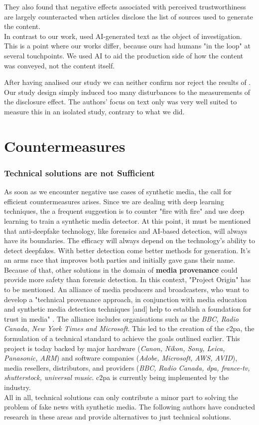 \documentclass[
  a4paper,  %
  twoside,  %
  bibliography=totoc,
  headsepline,
  cleardoublepage=empty,
  parskip=half,
  draft=false
]{scrbook}
\begin{document}
They also found that negative effects associated with perceived trustworthiness are largely counteracted when articles disclose the list of sources used to generate the content. \\
In contrast to our work, \citeauthor{toffTheyCouldJust2023} used AI-generated text as the object of investigation. This is a point where our works differ, because ours had humans "in the loop" at several touchpoints. We used AI to aid the production side of how the content was conveyed, not the content itself.

After having analised our study we can neither confirm nor reject the results of \citet{toffTheyCouldJust2023}. Our study design simply induced too many disturbances to the measurements of the disclosure effect. The authors' focus on text only was very well suited to measure this in an isolated study, contrary to what we did. 
\section{Countermeasures}
\label{sec:rel-work-counteringdf}
\subsubsection*{Technical solutions are not Sufficient}
As soon as we encounter negative use cases of synthetic media, the call for efficient countermeasures arises. Since we are dealing with deep learning techniques, the a frequent suggestion is to counter "fire with fire" and use deep learning to train a synthetic media detector. At this point, it must be mentioned that anti-deepfake technology, like forensics and AI-based detection, will always have its boundaries. The efficacy will always depend on the technology's ability to detect deepfakes. With better detection come better methods for generation. It's an arms race that improves both parties and initially gave \gls{gan}s their name. \\
Because of that, other solutions in the domain of \textbf{media provenance} could provide more safety than forensic detection. In this context, "Project Origin" has to be mentioned. An alliance of media producers and broadcasters, who want to develop a "technical provenance approach, in conjunction with media education and synthetic media detection techniques [and] help to establish a foundation for trust in media" \cite{ProjectOrigin}. The alliance includes organisations such as the \textit{BBC, Radio Canada, New York Times and Microsoft}. This led to the creation of the \gls{c2pa}, the formulation of a technical standard to achieve the goals outlined earlier. This project is today backed by major hardware (\textit{Canon, Nikon, Sony, Leica, Panasonic, ARM}) and software companies (\textit{Adobe, Microsoft, AWS, AVID}), media resellers, distributors, and providers (\textit{BBC, Radio Canada, dpa, france-tv, shutterstock, universal music}. \gls{c2pa} is currently being implemented by the industry. \\
All in all, technical solutions can only contribute a minor part to solving the problem of fake news with synthetic media. The following authors have conducted research in these areas and provide alternatives to just technical solutions. 
\end{document}
